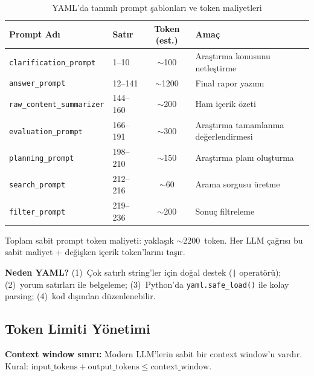 \begin{table}[H]
\centering
\caption{YAML'da tan{\i}ml{\i} prompt \c{s}ablonlar{\i} ve token maliyetleri}
\label{tab:prompts}
\begin{tabularx}{\textwidth}{llcX}
\toprule
\color{chapterBlue}\textbf{Prompt Ad{\i}} &
\color{chapterBlue}\textbf{Sat{\i}r} &
\color{chapterBlue}\textbf{Token (est.)} &
\color{chapterBlue}\textbf{Ama\c{c}} \\
\midrule
\texttt{clarification\_prompt} & 1--10 & $\sim$100 & Ara\c{s}t{\i}rma konusunu netle\c{s}tirme \\
\texttt{answer\_prompt} & 12--141 & $\sim$1200 & Final rapor yaz{\i}m{\i} \\
\texttt{raw\_content\_summarizer} & 144--160 & $\sim$200 & Ham i\c{c}erik \"{o}zeti \\
\texttt{evaluation\_prompt} & 166--191 & $\sim$300 & Ara\c{s}t{\i}rma tamamlanma de\u{g}erlendirmesi \\
\texttt{planning\_prompt} & 198--210 & $\sim$150 & Ara\c{s}t{\i}rma plan{\i} olu\c{s}turma \\
\texttt{search\_prompt} & 212--216 & $\sim$60 & Arama sorgusu \"{u}retme \\
\texttt{filter\_prompt} & 219--236 & $\sim$200 & Sonu\c{c} filtreleme \\
\bottomrule
\end{tabularx}
\end{table}

Toplam sabit prompt token maliyeti: yakla\c{s}{\i}k $\sim$2200~token. Her LLM \c{c}a\u{g}r{\i}s{\i} bu sabit maliyet + de\u{g}i\c{s}ken i\c{c}erik token'lar{\i}n{\i} ta\c{s}{\i}r.

\textbf{Neden YAML?} (1)~\c{C}ok sat{\i}rl{\i} string'ler i\c{c}in do\u{g}al destek (\texttt{|} operat\"{o}r\"{u}); (2)~yorum sat{\i}rlar{\i} ile belgeleme; (3)~Python'da \texttt{yaml.safe\_load()} ile kolay parsing; (4)~kod d{\i}\c{s}{\i}ndan d\"{u}zenlenebilir.


\subsection{Token Limiti Y\"{o}netimi}
\label{sec:token-management}

\begin{tanim}
\textbf{Context window s{\i}n{\i}r{\i}:} Modern LLM'lerin sabit bir context window'u vard{\i}r. Kural: $\text{input\_tokens} + \text{output\_tokens} \leq \text{context\_window}$.
\end{tanim}

